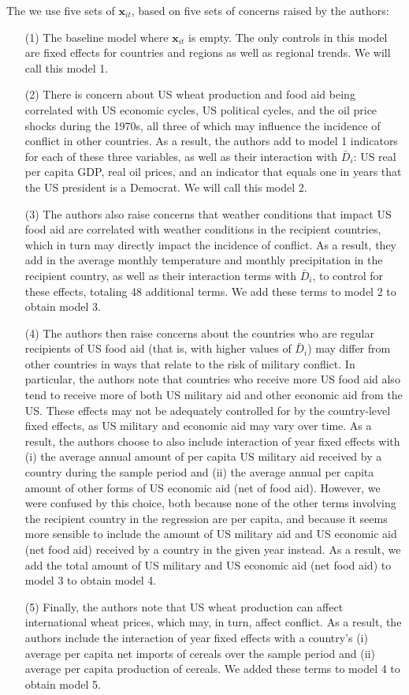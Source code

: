 \documentclass{article}
\newcommand{\x}{\mathbf x}
\begin{document}
The we use five sets of $\x_{it}$, based on five sets of concerns raised by the authors:
\begin{enumerate}
\item[(1)] The baseline model where $\x_{it}$ is empty. The only controls in this model are fixed effects for countries and regions as well as regional trends. We will call this model 1. 
\item[(2)] There is concern about US wheat production and food aid being correlated with US economic cycles, US political cycles, and the oil price shocks during the 1970s, all three of which may influence the incidence of conflict in other countries. As a result, the authors add to model 1 indicators for each of these three variables, as well as their interaction with $\bar D_{i}$: US real per capita GDP, real oil prices, and an indicator that equals one in years that the US president is a Democrat. We will call this model 2. 
\item[(3)] The authors also raise concerns that weather conditions that impact US food aid are correlated with weather conditions in the recipient countries, which in turn may directly impact the incidence of conflict. As a result, they add in the average monthly temperature and monthly precipitation in the recipient country, as well as their interaction terms with $\bar D_{i}$, to control for these effects, totaling 48 additional terms. We add these terms to model 2 to obtain model 3. 
\item[(4)] The authors then raise concerns about the countries who are regular recipients of US food aid (that is, with higher values of $\bar D_{i}$) may differ from other countries in ways that relate to the risk of military conflict. In particular, the authors note that countries who receive more US food aid also tend to receive more of both US military aid and other economic aid from the US. These effects may not be adequately controlled for by the country-level fixed effects, as US military and economic aid may vary over time. As a result, the authors choose to also include  interaction of year fixed effects with (i) the average annual amount of per capita US military aid received by a country during the sample period and (ii) the average annual per capita amount of other forms of US economic aid (net of food aid). However, we were confused by this choice, both because none of the other terms involving the recipient country in the regression are per capita, and because it seems more sensible to include the amount of US military aid and US economic aid (net food aid) received by a country in the given year instead. As a result, we add the total amount of US military and US economic aid (net food aid) to model 3 to obtain model 4. 
\item[(5)] Finally, the authors note that US wheat production can affect international wheat prices, which may, in turn, affect conflict. As a result, the authors include the interaction of year fixed effects with a country’s (i) average per capita net imports of cereals over the sample period and (ii) average per capita production of cereals. We added these terms to model 4 to obtain model 5. 
\end{enumerate}
\end{document}
